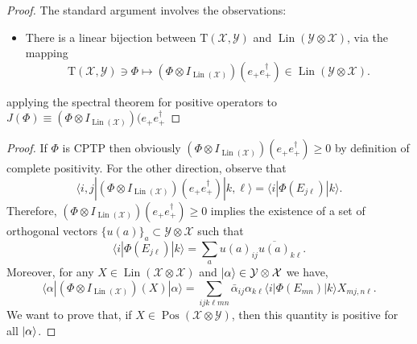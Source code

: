 \documentclass[12pt]{report}
\newcommand{\calY}{{\mathcal{Y}}}
\newcommand{\calX}{{\mathcal{X}}}
\newcommand{\rmT}{{\mathrm{T}}}
\DeclareMathOperator{\Pos}{Pos}
\DeclareMathOperator{\Lin}{Lin}
\begin{document}
\begin{proof}
	The standard argument involves the observations:
	\begin{itemize}
		\item There is a linear bijection between $\rmT(\calX,\calY)$ and $\Lin(\calY\otimes\calX)$, via the mapping
		\begin{equation}
			\rmT(\calX,\calY)\ni \Phi\mapsto (\Phi\otimes I_{\Lin(\calX)})(e_+ e_+^\dagger)\in\Lin(\calY\otimes\calX).
		\end{equation}
	\end{itemize}
	 applying the spectral theorem for positive operators to
	$J(\Phi)\equiv (\Phi\otimes I_{\Lin(\calX)})(e_+ e_+^\dagger$
\end{proof}

\begin{proof}
	If $\Phi$ is CPTP then obviously $(\Phi\otimes I_{\Lin(\calX)})(e_+ e_+^\dagger)\ge0$ by definition of complete positivity.
	For the other direction, observe that
	\begin{equation}
		\langle i,j| (\Phi\otimes I_{\Lin(\calX)})(e_+ e_+^\dagger) |k,\ell\rangle
		= \langle i | \Phi(E_{j\ell}) | k\rangle.
	\end{equation}
	Therefore, $(\Phi\otimes I_{\Lin(\calX)})(e_+ e_+^\dagger)\ge0$ implies the existence of a set of orthogonal vectors $\{u(a)\}_a\subset\calY\otimes\calX$ such that
	\begin{equation}
		\langle i|\Phi(E_{j\ell})|k\rangle
		= \sum_a u(a)_{ij} \overline{u(a)}_{k\ell}.
	\end{equation}
	Moreover, for any $X\in\Lin(\calX\otimes\calX)$ and $\ket\alpha\in \calY\otimes\calX$ we have,
	\begin{equation}
		\langle \alpha| (\Phi\otimes I_{\Lin(\calX)})(X) |\alpha\rangle
		= \sum_{ijk\ell mn}
		\bar\alpha_{ij} \alpha_{k\ell}
		\langle i|\Phi(E_{mn})|k\rangle X_{mj,n\ell}.
	\end{equation}
	We want to prove that, if $X\in\Pos(\calX\otimes\calY)$, then this quantity is positive for all $\ket\alpha$.


\end{proof}
\end{document}
